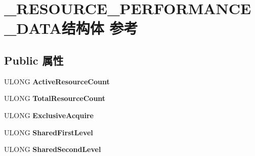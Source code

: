 \hypertarget{struct___r_e_s_o_u_r_c_e___p_e_r_f_o_r_m_a_n_c_e___d_a_t_a}{}\section{\+\_\+\+R\+E\+S\+O\+U\+R\+C\+E\+\_\+\+P\+E\+R\+F\+O\+R\+M\+A\+N\+C\+E\+\_\+\+D\+A\+T\+A结构体 参考}
\label{struct___r_e_s_o_u_r_c_e___p_e_r_f_o_r_m_a_n_c_e___d_a_t_a}
\subsection*{Public 属性}
\begin{DoxyCompactItemize}
\item 
\mbox{\label{struct___r_e_s_o_u_r_c_e___p_e_r_f_o_r_m_a_n_c_e___d_a_t_a_a259d68b233f050c73bec8436ef8eb50c}} 
U\+L\+O\+NG {\bfseries Active\+Resource\+Count}
\item 
\mbox{\label{struct___r_e_s_o_u_r_c_e___p_e_r_f_o_r_m_a_n_c_e___d_a_t_a_afbeb65cd7a8c624437e6241cdc6cc782}} 
U\+L\+O\+NG {\bfseries Total\+Resource\+Count}
\item 
\mbox{\label{struct___r_e_s_o_u_r_c_e___p_e_r_f_o_r_m_a_n_c_e___d_a_t_a_a109c10dc9c01b1a1edd3b840536e87e6}} 
U\+L\+O\+NG {\bfseries Exclusive\+Acquire}
\item 
\mbox{\label{struct___r_e_s_o_u_r_c_e___p_e_r_f_o_r_m_a_n_c_e___d_a_t_a_a746bab90ae56059e09fc41a2dfda5fc3}} 
U\+L\+O\+NG {\bfseries Shared\+First\+Level}
\item 
\mbox{\label{struct___r_e_s_o_u_r_c_e___p_e_r_f_o_r_m_a_n_c_e___d_a_t_a_a792a6c9998bc1feb1a5bd4b498251f95}} 
U\+L\+O\+NG {\bfseries Shared\+Second\+Level}
\item 
\mbox{\label{struct___r_e_s_o_u_r_c_e___p_e_r_f_o_r_m_a_n_c_e___d_a_t_a_a48f7f94e6c54a8c70bbcb98abbf9afed}} 

\end{DoxyCompactItemize}
